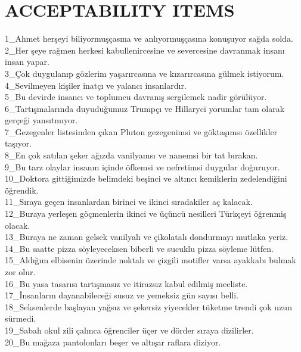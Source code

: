 \chapter{\MakeUppercase{acceptability items}} \label{acceptabilityitems}

1\_Ahmet herşeyi biliyormuşçasına ve anlıyormuşçasına konuşuyor sağda solda. \\
2\_Her şeye rağmen herkesi kabullenircesine ve severcesine davranmak insanı insan yapar. \\
3\_Çok duygulanıp gözlerim yaşarırcasına ve kızarırcasına gülmek istiyorum. \\
4\_Sevilmeyen kişiler inatçı ve yalancı insanlardır. \\
5\_Bu devirde insancı ve toplumcu davranış sergilemek nadir görülüyor. \\
6\_Tartışmalarında duyuduğumuz Trumpçı ve Hillaryci yorumlar tam olarak gerçeği yansıtmıyor. \\
7\_Gezegenler listesinden çıkan Pluton gezegenimsi ve göktaşımsı özellikler taşıyor. \\
8\_En çok satılan şeker ağızda vanilyamsı ve nanemsi bir tat bırakan. \\
9\_Bu tarz olaylar insanın içinde öfkemsi ve nefretimsi duygular doğuruyor. \\
10\_Doktora gittiğimizde belimdeki beşinci ve altıncı kemiklerin zedelendiğini öğrendik. \\
11\_Sıraya geçen insanlardan birinci ve ikinci sıradakiler aç kalacak. \\
12\_Buraya yerleşen göçmenlerin ikinci ve üçüncü nesilleri Türkçeyi öğrenmiş olacak. \\
13\_Buraya ne zaman gelsek vanilyalı ve çikolatalı dondurmayı mutlaka yeriz. \\
14\_Bu saatte pizza söyleyeceksen biberli ve sucuklu pizza söyleme lütfen. \\
15\_Aldığım elbisenin üzerinde noktalı ve çizgili motifler varsa ayakkabı bulmak zor olur. \\
16\_Bu yasa tasarısı tartışmasız ve itirazsız kabul edilmiş mecliste. \\
17\_İnsanların dayanabileceği susuz ve yemeksiz gün sayısı belli. \\
18\_Seksenlerde başlayan yağsız ve şekersiz yiyecekler tüketme trendi çok uzun sürmedi. \\
19\_Sabah okul zili çalınca öğrenciler üçer ve dörder sıraya dizilirler. \\
20\_Bu mağaza pantolonları beşer ve altışar raflara diziyor. \\
